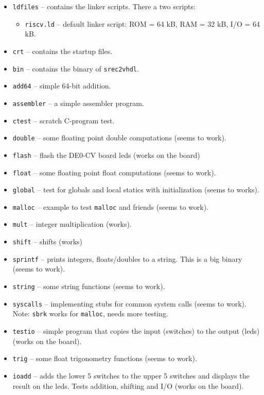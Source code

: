 \documentclass[12pt]{article}
\begin{document}
\begin{itemize}
\item \texttt{ldfiles} -- contains the linker scripts. There a two scripts:
\begin{itemize}
\item \texttt{riscv.ld} -- default linker script: ROM = 64 kB, RAM = 32 kB, I/O = 64 kB.
\end{itemize}
\item \texttt{crt} -- contains the startup files.
\item \texttt{bin} -- contains the binary of \texttt{srec2vhdl}.
\item \texttt{add64} -- simple 64-bit addition.
\item \texttt{assembler} -- a simple assembler program.
\item \texttt{ctest} -- scratch C-program test.
\item \texttt{double} -- some floating point double computations (seems to work).
\item \texttt{flash} -- flash the DE0-CV board leds (works on the board)
\item \texttt{float} -- some floating point float computations (seems to work).
\item \texttt{global} -- test for globals and local statics with initialization (seems to works).
\item \texttt{malloc} -- example to test \texttt{malloc} and friends (seems to work).
\item \texttt{mult} -- integer multiplication (works).
\item \texttt{shift} -- shifts (works)
\item \texttt{sprintf} -- prints integers, floats/doubles to a string. This is a big binary (seems to work).
\item \texttt{string} -- some string functions (seems to work).
\item \texttt{syscalls} -- implementing stubs for common system calls (seems to work). Note: \texttt{sbrk} works for \texttt{malloc}, needs more testing.
\item \texttt{testio} -- simple program that copies the input (switches) to the output (leds) (works on the board).
\item \texttt{trig} -- some float trigonometry functions (seems to work).
\item \texttt{ioadd} -- adds the lower 5 switches to the upper 5 switches and displays the result on the leds. Tests addition, shifting and I/O (works on the board).
\end{itemize} 
\end{document}
